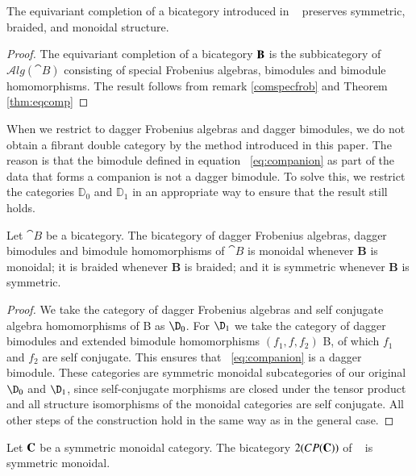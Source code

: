 \documentclass{amsart}
\begin{document}
\begin{cor}
The equivariant completion of a bicategory introduced in ~\cite{carquevillerunkel} preserves symmetric, braided, and monoidal structure.
\end{cor}

\begin{proof}
The equivariant completion of a bicategory ${\bf B}$ is the subbicategory of $\mathcal{A}lg({\cat B})$ consisting of special Frobenius algebras, bimodules and bimodule homomorphisms. The result follows from remark \ref{comspecfrob} and Theorem \ref{thm:eqcomp}
\end{proof}

When we restrict to dagger Frobenius algebras and dagger bimodules, we do not obtain a fibrant double category by the method introduced in this paper. The reason is that the bimodule defined in equation ~\ref{eq:companion} as part of the data that forms a companion is not a dagger bimodule. To solve this, we restrict the categories $\mathbb{D}_0$ and $\mathbb{D}_1$ in an appropriate way to ensure that the result still holds.

\begin{prop}\label{prop:dagger}
Let ${\cat B}$ be a bicategory. The bicategory of dagger Frobenius algebras, dagger bimodules and bimodule homomorphisms of ${\cat B}$ is monoidal whenever {\bf B} is monoidal; it is braided whenever {\bf B} is braided; and it is symmetric whenever {\bf B} is symmetric.
\end{prop}

\begin{proof}
We take the category of dagger Frobenius algebras and self conjugate algebra homomorphisms of {\cat B} as $\D_0$. For $\D_1$ we take the category of dagger bimodules and extended bimodule homomorphisms $(f_1,f,f_2)$ {\cat B}, of which $f_1$ and $f_2$ are self conjugate. This ensures that ~\ref{eq:companion} is a dagger bimodule.  These categories are symmetric monoidal subcategories of our original $\D_0$ and $\D_1$, since self-conjugate morphisms are closed under the tensor product and all structure isomorphisms of the monoidal categories are self conjugate. All other steps of the construction hold in the same way as in the general case.  
\end{proof}

\begin{cor}
Let ${\bf C}$ be a symmetric monoidal category. The bicategory $2(CP({\bf C}))$ of ~\cite{heunenvicarywester} is symmetric monoidal.
\end{cor}
\end{document}
